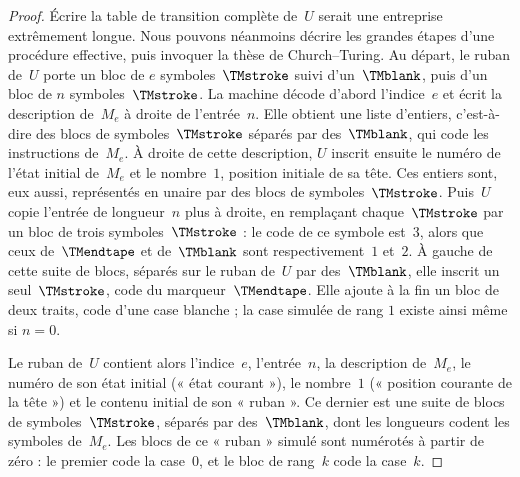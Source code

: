 \documentclass[../../../include/open-logic-section]{subfiles}
\begin{document}
\begin{proof}
Écrire la table de transition complète de~$U$ serait une entreprise
extrêmement longue. Nous pouvons néanmoins décrire les grandes
étapes d'une procédure effective, puis invoquer la thèse de
Church--Turing. Au départ, le ruban de~$U$ porte un bloc de
$e$ symboles~$\TMstroke$ suivi d'un~$\TMblank$, puis d'un bloc de
$n$ symboles~$\TMstroke$. La machine décode d'abord l'indice~$e$
et écrit la description de~$M_e$ à droite de l'entrée~$n$.
Elle obtient une liste d'entiers, c'est-à-dire des blocs de
symboles~$\TMstroke$ séparés par des~$\TMblank$, qui code
les instructions de~$M_e$. À droite de cette description,
$U$ inscrit ensuite le numéro de l'état initial de~$M_e$
et le nombre~$1$, position initiale de sa tête. Ces entiers
sont, eux aussi, représentés en unaire par des blocs de
symboles~$\TMstroke$. Puis~$U$ copie l'entrée de longueur~$n$
plus à droite, en remplaçant chaque~$\TMstroke$ par un bloc
de trois symboles~$\TMstroke$ : le code de ce symbole est~$3$,
alors que ceux de~$\TMendtape$ et de~$\TMblank$ sont
respectivement~$1$ et~$2$. À gauche de cette suite de blocs,
séparés sur le ruban de~$U$ par des~$\TMblank$, elle inscrit
un seul~$\TMstroke$, code du marqueur~$\TMendtape$. Elle ajoute à la fin un bloc de deux traits, code d'une case blanche ; la case simulée de rang $1$ existe ainsi même si $n=0$.

Le ruban de~$U$ contient alors l'indice~$e$, l'entrée~$n$,
la description de~$M_e$, le numéro de son état initial
(« état courant »), le nombre~$1$ (« position courante de la
tête ») et le contenu initial de son « ruban ». Ce dernier
est une suite de blocs de symboles~$\TMstroke$, séparés par
des~$\TMblank$, dont les longueurs codent les symboles de~$M_e$. Les blocs de ce « ruban » simulé sont numérotés à partir de zéro : le premier code la case~$0$, et le bloc de rang~$k$ code la case~$k$.


\end{proof}
\end{document}
